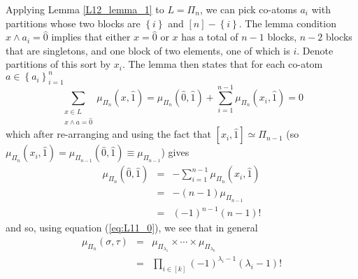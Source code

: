 \documentclass[11pt,english]{article}
\begin{document}
Applying Lemma \ref{L12_lemma_1} to $L=\Pi_{n}$, we can pick co-atoms
$a_{i}$ with partitions whose two blocks are $\left\{ i\right\} $
and $\left[n\right]-\left\{ i\right\} $. The lemma condition $x\wedge a_{i}=\hat{0}$
implies that either $x=\hat{0}$ or $x$ has a total of $n-1$ blocks,
$n-2$ blocks that are singletons, and one block of two elements,
one of which is $i$. Denote partitions of this sort by $x_{i}$.
The lemma then states that for each co-atom $a\in\left\{ a_{i}\right\} _{i=1}^{n}$\[
\sum_{\substack{x\in L\\
x\wedge a=\hat{0}}
}\mu_{\Pi_{n}}\left(x,\hat{1}\right)=\mu_{\Pi_{n}}\left(\hat{0},\hat{1}\right)+\sum_{i=1}^{n-1}\mu_{\Pi_{n}}\left(x_{i},\hat{1}\right)=0\]
which after re-arranging and using the fact that $\left[x_{i},\hat{1}\right]\simeq\Pi_{n-1}$
(so $\mu_{\Pi_{n}}\left(x_{i},\hat{1}\right)=\mu_{\Pi_{n-1}}\left(\hat{0},\hat{1}\right)\equiv\mu_{\Pi_{n-1}}$)
gives\begin{eqnarray*}
\mu_{\Pi_{n}}\left(\hat{0},\hat{1}\right) & = & -\sum_{i=1}^{n-1}\mu_{\Pi_{n}}\left(x_{i},\hat{1}\right)\\
 & = & -\left(n-1\right)\mu_{\Pi_{n-1}}\\
 & = & \left(-1\right)^{n-1}\left(n-1\right)!\end{eqnarray*}
and so, using equation (\ref{eq:L11_0}), we see that in general\begin{eqnarray*}
\mu_{\Pi_{n}}\left(\sigma,\tau\right) & = & \mu_{\Pi_{\lambda_{1}}}\times\cdots\times\mu_{\Pi_{\lambda_{k}}}\\
 & = & \prod_{i\in\left[k\right]}\left(-1\right)^{\lambda_{i}-1}\left(\lambda_{i}-1\right)!\end{eqnarray*}
\end{document}
